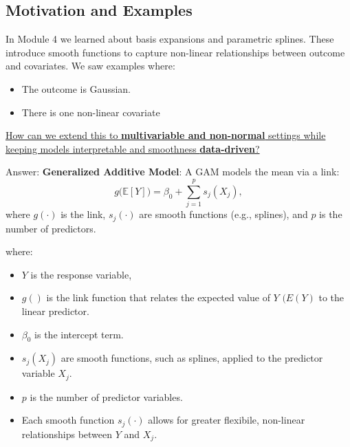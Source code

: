 \documentclass[
  letterpaper,
  DIV=11,
  numbers=noendperiod]{scrreprt}
\begin{document}
\hypertarget{motivation-and-examples-9}{%
\subsection*{Motivation and Examples}\label{motivation-and-examples-9}}

\begin{tcolorbox}[enhanced jigsaw, breakable, colbacktitle=quarto-callout-important-color!10!white, left=2mm, colframe=quarto-callout-important-color-frame, opacityback=0, coltitle=black, colback=white, rightrule=.15mm, title=\textcolor{quarto-callout-important-color}{\faExclamation}\hspace{0.5em}{Motivation}, titlerule=0mm, opacitybacktitle=0.6, leftrule=.75mm, toprule=.15mm, arc=.35mm, bottomtitle=1mm, toptitle=1mm, bottomrule=.15mm]

In Module 4 we learned about basis expansions and parametric splines.
These introduce smooth functions to capture non-linear relationships
between outcome and covariates. We saw examples where:

\begin{itemize}
\item
  The outcome is Gaussian.
\item
  There is one non-linear covariate
\end{itemize}

\ul{How can we extend this to \textbf{multivariable and non-normal}
settings while keeping models interpretable and smoothness
\textbf{data-driven}?}

Answer: \textbf{Generalized Additive Model}: A GAM models the mean via a
link: \[
g\!\big(\mathbb{E}[Y]\big) = \beta_0 + \sum_{j=1}^p s_j(X_j),
\] where \(g(\cdot)\) is the link, \(s_j(\cdot)\) are smooth functions
(e.g., splines), and \(p\) is the number of predictors.

where:

\begin{itemize}
\item
  \(Y\) is the response variable,
\item
  \(g()\) is the link function that relates the expected value of \(Y\)
  \((E(Y)\) to the linear predictor.
\item
  \(\beta_0\) is the intercept term.
\item
  \(s_j(X_j)\) are smooth functions, such as splines, applied to the
  predictor variable \(X_j\).
\item
  \(p\) is the number of predictor variables.
\item
  Each smooth function \(s_j(\cdot)\) allows for greater flexibile,
  non-linear relationships between \(Y\) and \(X_j\).
\end{itemize}


\end{tcolorbox}
\end{document}
